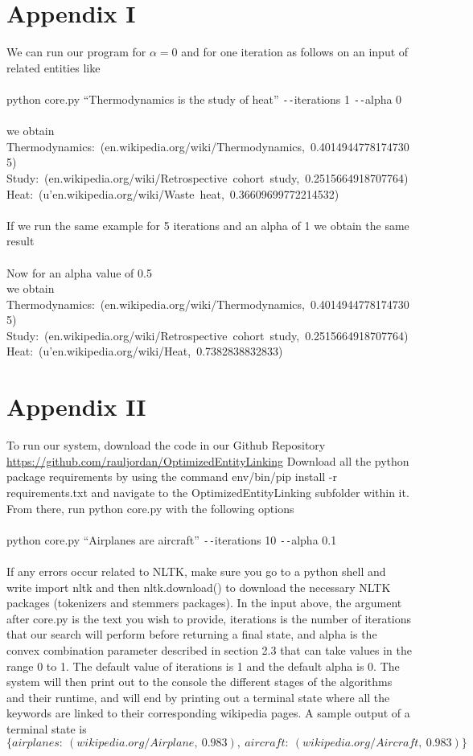 \documentclass[twoside,11pt]{article}
\begin{document}
\section{Appendix I}
We can run our program for $\alpha = 0$ and for one iteration as follows on an input of related entities like
\\ \\
python core.py ``Thermodynamics is the study of heat'' \texttt{-{}-}iterations 1 \texttt{-{}-}alpha 0
\\ \\
we obtain
\mbox{Thermodynamics: (en.wikipedia.org/wiki/Thermodynamics, 0.40149447781747305)}
\\
\mbox{Study: (en.wikipedia.org/wiki/Retrospective cohort study, 0.2515664918707764)}
\\
\mbox{Heat: (u'en.wikipedia.org/wiki/Waste heat, 0.36609699772214532)}
\\ \\
If we run the same example for 5 iterations and an alpha of 1 we obtain the same result
\\ \\
Now for an alpha value of 0.5
\\
we obtain
\mbox{Thermodynamics: (en.wikipedia.org/wiki/Thermodynamics, 0.40149447781747305)}
\\
\mbox{Study: (en.wikipedia.org/wiki/Retrospective cohort study, 0.2515664918707764)}
\\
\mbox{Heat: (u'en.wikipedia.org/wiki/Heat, 0.7382838832833)}
\section{Appendix II}
To run our system, download the code in our Github Repository
 \url{https://github.com/rauljordan/OptimizedEntityLinking} Download all the python package requirements by using the command env/bin/pip install -r requirements.txt and navigate to the OptimizedEntityLinking subfolder within it. From there, run python core.py with the following options
\\ \\
python core.py ``Airplanes are aircraft'' \texttt{-{}-}iterations 10 \texttt{-{}-}alpha 0.1
\\ \\
If any errors occur related to NLTK, make sure you go to a python shell and write import nltk and then nltk.download() to download the necessary NLTK packages (tokenizers and stemmers packages). In the input above, the argument after core.py is the text you wish to provide, iterations is the number of iterations that our search will perform before returning a final state, and alpha is the convex combination parameter described in section 2.3 that can take values in the range 0 to 1. The default value of iterations is 1 and the default alpha is 0. The system will then print out to the console the different stages of the algorithms and their runtime, and will end by printing out a terminal state where all the keywords are linked to their corresponding wikipedia pages. A sample output of a terminal state is
$$\{airplanes: \ (wikipedia.org/Airplane, \ 0.983), \ aircraft: \ (wikipedia.org/Aircraft, \ 0.983)\}$$
\end{document}
